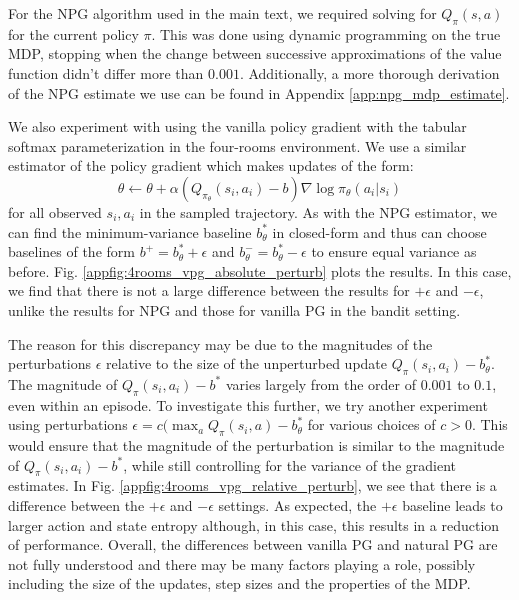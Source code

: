 For the NPG algorithm used in the main text, we required solving for $Q_\pi(s,a)$ for the current policy $\pi$. This was done using dynamic programming on the true MDP, stopping when the change between successive approximations of the value function didn't differ more than $0.001$. 
Additionally, a more thorough derivation of the NPG estimate we use can be found in Appendix \ref{app:npg_mdp_estimate}.

We also experiment with using the vanilla policy gradient with the tabular softmax parameterization in the four-rooms environment. We use a similar estimator of the policy gradient which makes updates of the form: 
\[ \theta \xleftarrow{} \theta + \alpha (Q_{\pi_\theta} (s_i, a_i) - b) \nabla \log \pi_\theta (a_i|s_i) \]
for all observed $s_i, a_i$ in the sampled trajectory. 
As with the NPG estimator, we can find the minimum-variance baseline $b^*_\theta$ in closed-form and thus can choose baselines of the form $b^+ = b^*_\theta + \epsilon$ and $b^-_\theta = b^*_\theta - \epsilon$ to ensure equal variance as before. 
Fig. \ref{appfig:4rooms_vpg_absolute_perturb} plots the results. In this case, we find that there is not a large difference between the results for $+\epsilon$ and $-\epsilon$, unlike the results for NPG and those for vanilla PG in the bandit setting. 

The reason for this discrepancy may be due to the magnitudes of the perturbations $\epsilon$ relative to the size of the unperturbed update $Q_\pi(s_i, a_i) - b^*_\theta$. The magnitude of $Q_\pi(s_i, a_i) - b^*$ varies largely from the order of $0.001$ to $0.1$, even within an episode.  To investigate this further, we try another experiment using perturbations $\epsilon = c (\max_a Q_\pi(s_i,a) - b^*_\theta$ for various choices of $c > 0$. This would ensure that the magnitude of the perturbation is similar to the magnitude of $Q_\pi(s_i, a_i) - b^*$, while still controlling for the variance of the gradient estimates. 
In Fig. \ref{appfig:4rooms_vpg_relative_perturb}, we see that there is a difference between the $+\epsilon$ and $-\epsilon$ settings. As expected, the $+\epsilon$ baseline leads to larger action and state entropy although, in this case, this results in a reduction of performance. 
Overall, the differences between vanilla PG and natural PG are not fully understood and there may be many factors playing a role, possibly including the size of the updates, step sizes and the properties of the MDP. 

